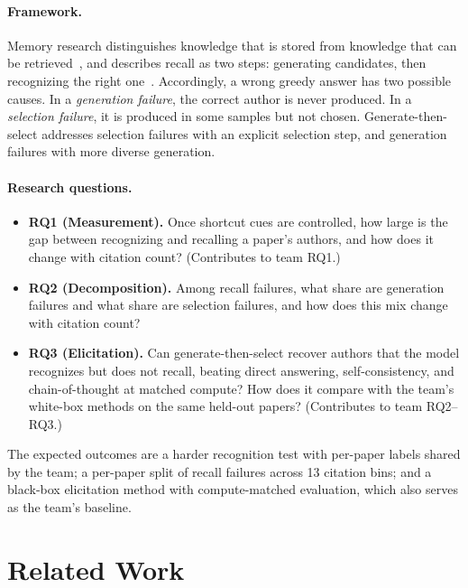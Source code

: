 \documentclass[sigconf,nonacm]{acmart}
\begin{document}
\paragraph{Framework.}
Memory research distinguishes knowledge that is stored from knowledge that can be retrieved~\cite{tulving1966availability}, and describes recall as two steps: generating candidates, then recognizing the right one~\cite{kintsch1970models,anderson1972recognition}. Accordingly, a wrong greedy answer has two possible causes. In a \emph{generation failure}, the correct author is never produced. In a \emph{selection failure}, it is produced in some samples but not chosen. Generate-then-select addresses selection failures with an explicit selection step, and generation failures with more diverse generation.

\paragraph{Research questions.}
\begin{itemize}
\item \textbf{RQ1 (Measurement).} Once shortcut cues are controlled, how large is the gap between recognizing and recalling a paper's authors, and how does it change with citation count? (Contributes to team RQ1.)
\item \textbf{RQ2 (Decomposition).} Among recall failures, what share are generation failures and what share are selection failures, and how does this mix change with citation count?
\item \textbf{RQ3 (Elicitation).} Can generate-then-select recover authors that the model recognizes but does not recall, beating direct answering, self-consistency, and chain-of-thought at matched compute? How does it compare with the team's white-box methods on the same held-out papers? (Contributes to team RQ2--RQ3.)
\end{itemize}

\noindent The expected outcomes are a harder recognition test with per-paper labels shared by the team; a per-paper split of recall failures across 13 citation bins; and a black-box elicitation method with compute-matched evaluation, which also serves as the team's baseline.

\section{Related Work}
\end{document}
